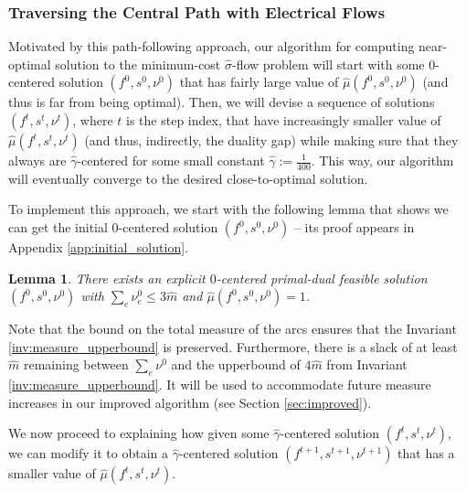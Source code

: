 \documentclass[11pt, letterpaper]{article}
\newtheorem{lemma}[theorem]{Lemma}
\newcommand{\hm}{\widehat{m}}
\newcommand{\hmu}{\hat{\mu}}
\newcommand{\hgamma}{\hat{\gamma}}
\newcommand{\vnu}{\boldsymbol{\mathit{\nu}}}
\newcommand{\hvsigma}{\boldsymbol{\mathit{\hat{\sigma}}}}
\newcommand{\ff}{\boldsymbol{\mathit{f}}}
\renewcommand{\ss}{\boldsymbol{\mathit{s}}}
\begin{document}
 \subsubsection*{Traversing the Central Path with Electrical Flows}

Motivated by this path-following approach, our algorithm for computing near-optimal solution to the minimum-cost $\hvsigma$-flow problem will start with some $0$-centered solution $(\ff^0,\ss^0, \vnu^0)$ that has fairly large value of $\hmu(\ff^0,\ss^0,\vnu^0)$ (and thus is far from being optimal). Then, we will devise a sequence of solutions $(\ff^t,\ss^t, \vnu^t)$, where $t$ is the step index, that have increasingly smaller value of $\hmu(\ff^t,\ss^t,\vnu^t)$ (and thus, indirectly, the duality gap) while making sure that they always are $\hgamma$-centered for some small constant $\hgamma:= \frac{1}{400}$. This way, our algorithm will eventually converge to the desired close-to-optimal solution.

To implement this approach, we start with the following lemma that shows we can get the initial $0$-centered solution $(\ff^0,\ss^0,\vnu^0)$ -- its proof appears in Appendix \ref{app:initial_solution}. 
\begin{lemma}
\label{lem:initial_solution}
There exists an explicit $0$-centered primal-dual feasible solution $(\ff^0,\ss^0,\vnu^0)$ with $\sum_e \nu^0_e \leq 3\hm$ and $\hmu(\ff^0,\ss^0,\vnu^0)=1$. 
\end{lemma}



Note that the bound on the total measure of the arcs ensures that the Invariant \ref{inv:measure_upperbound} is preserved. Furthermore, there is a slack of at least $\hm$ remaining between $\sum_e \vnu^0$ and the upperbound of $4\hm$ from Invariant \ref{inv:measure_upperbound}. It will be used to accommodate future measure increases in our improved algorithm (see Section \ref{sec:improved}).  

We now proceed to explaining how given some $\hgamma$-centered solution $(\ff^t,\ss^t,\vnu^t)$, we can modify it to obtain a $\hgamma$-centered solution $(\ff^{t+1},\ss^{t+1},\vnu^{t+1})$ that has a smaller value of $\hmu(\ff^t,\ss^t,\vnu^t)$. 
\end{document}
